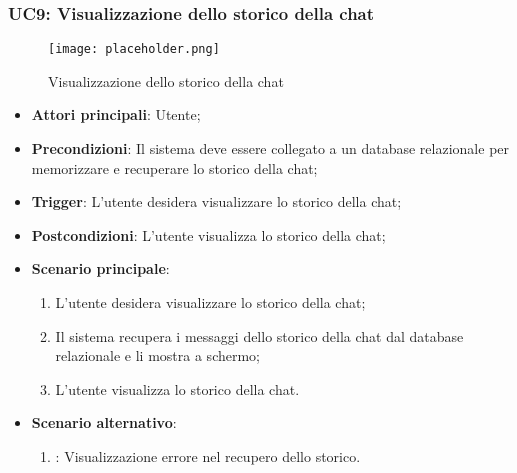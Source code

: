 \newpage
\hypertarget{UC9}{}
\subsubsection{UC9: Visualizzazione dello storico della chat}

\begin{figure}[h]
    \centering
    \texttt{[image: placeholder.png]}
    \caption{Visualizzazione dello storico della chat}
\end{figure}

\begin{itemize}
    \item \textbf{Attori principali}: Utente;
    \item \textbf{Precondizioni}: Il sistema deve essere collegato a un database relazionale per memorizzare e recuperare lo storico della chat;
    \item \textbf{Trigger}: L'utente desidera visualizzare lo storico della chat;
    \item \textbf{Postcondizioni}: L'utente visualizza lo storico della chat;
    \item \textbf{Scenario principale}:
    \begin{enumerate}
        \item L'utente desidera visualizzare lo storico della chat;
        \item Il sistema recupera i messaggi dello storico della chat dal database relazionale e li mostra a schermo;
        \item L'utente visualizza lo storico della chat.
    \end{enumerate}
    \item \textbf{Scenario alternativo}:
    \begin{enumerate}
        \item {}: Visualizzazione errore nel recupero dello storico.
    \end{enumerate}
\end{itemize}


\hypertarget{UC10}{}
